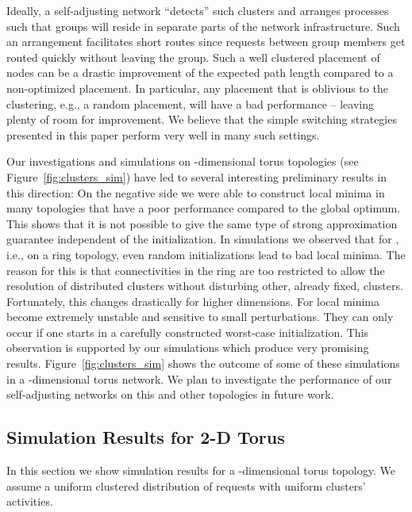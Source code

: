 \documentclass[conference]{IEEEtran}
\begin{document}
Ideally, a self-adjusting network ``detects'' such clusters and arranges processes such that groups will reside in separate parts of the network infrastructure. Such an arrangement facilitates short routes since requests between group members get routed quickly without leaving the group. Such a well clustered placement of nodes can be a drastic improvement of the expected path length compared to a non-optimized placement. In particular, any placement that is oblivious to the clustering, e.g., a random placement, will have a bad performance -- leaving plenty of room for improvement. We believe that the simple switching strategies presented in this paper perform very well in many such settings.

Our investigations and simulations on -dimensional torus topologies (see Figure~\ref{fig:clusters_sim}) have led to several interesting preliminary results in this direction: On the negative side we were able to construct local minima in many topologies that have a poor performance compared to the global optimum. This shows that it is not possible to give the same type of strong approximation guarantee independent of the initialization. In simulations we observed that for , i.e., on a ring topology, even random initializations lead to bad local minima. The reason for this is that connectivities in the ring are too restricted to allow the resolution of distributed clusters without disturbing other, already fixed, clusters. Fortunately, this changes drastically for higher dimensions. For   local minima become extremely unstable and sensitive to small perturbations. They can only occur if one starts in a carefully constructed worst-case initialization. This observation is supported by our simulations which produce very promising results. Figure~\ref{fig:clusters_sim} shows the outcome of some of these simulations in a -dimensional torus network. We plan to investigate the performance of our self-adjusting networks on this and other topologies in future work. 
 

\subsection{Simulation Results for 2-D Torus}\label{app_simu_torus}

In this section we show simulation results for a -dimensional torus topology. We assume a uniform clustered distribution of requests with uniform clusters' activities. 
\end{document}
